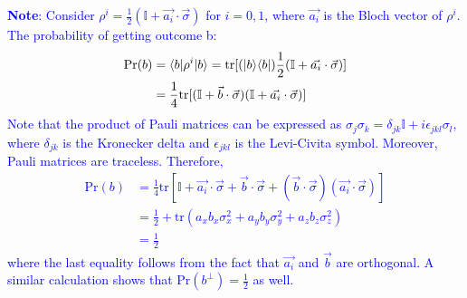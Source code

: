 \textcolor{blue}{\textbf{Note}: Consider $\rho^i = \frac{1}{2}(\mathbb{I} + \vec{a_i} \cdot \vec{\sigma})$ for $i=0,1$, 
where $\vec{a_i}$ is the Bloch vector of $\rho^i$. The probability of getting outcome b: 
\[
\begin{aligned}
    \text{Pr}(b) &= \langle b\rvert \rho^i \lvert b\rangle  = \text{tr}[(\lvert b\rangle\langle b\rvert)\frac{1}{2}(\mathbb{I} + \vec{a_i} \cdot \vec{\sigma})] \\
    &= \frac{1}{4}\text{tr}[(\mathbb{I} + \vec{b} \cdot \vec{\sigma})(\mathbb{I} + \vec{a_i} \cdot \vec{\sigma})] \\
\end{aligned}
\]
Note that the product of Pauli matrices can be expressed as $\sigma_j \sigma_k = \delta_{jk} \mathbb{I} + i \epsilon_{jkl} \sigma_l$, 
where $\delta_{jk}$ is the Kronecker delta and $\epsilon_{jkl}$ is the Levi-Civita symbol. Moreover, Pauli matrices are traceless. Therefore,
\[ 
\begin{aligned}
    \text{Pr}(b) &= \frac{1}{4}\text{tr}[\mathbb{I} + \vec{a_i} \cdot \vec{\sigma} + \vec{b} \cdot \vec{\sigma} + (\vec{b} \cdot \vec{\sigma})(\vec{a_i} \cdot \vec{\sigma})] \\
    &= \frac{1}{2} + \text{tr}(a_xb_x \sigma_x^2 + a_yb_y \sigma_y^2 + a_zb_z \sigma_z^2) \\
    &= \frac{1}{2} 
\end{aligned}
\]
where the last equality follows from the fact that $\vec{a_i}$ and $\vec{b}$ are orthogonal. A similar calculation shows that $\text{Pr}(b^\bot) = \frac{1}{2}$ as well.
}



